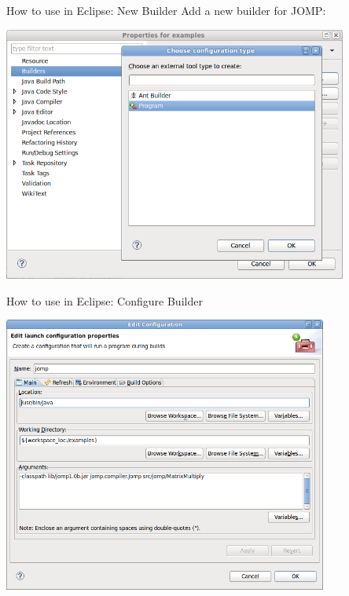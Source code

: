 \begin{frame}{How to use in Eclipse: New Builder}
  Add a new builder for JOMP:


  \begin{center}
    \includegraphics[width=0.85\textwidth]{figures/jomp-builder1}
  \end{center}
\end{frame}

\begin{frame}{How to use in Eclipse: Configure Builder}
  \begin{center}
    \includegraphics[width=0.8\textwidth]{figures/jomp-builder2}
  \end{center}
\end{frame}

